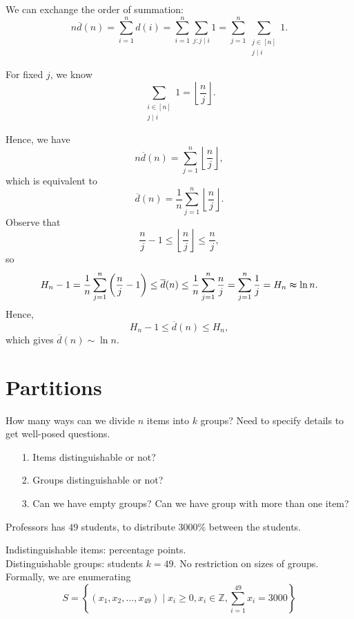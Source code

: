 We can exchange the order of summation: 
\[
    n \overline{d}(n) = \sum_{i=1}^n d(i) = \sum_{i=1}^n \sum_{j: j \mid i} 1 = \sum_{j=1}^n \sum_{\substack{j \in [n] \\ j \mid i}} 1.
\]

For fixed \(j\), we know 
\[
    \sum_{\substack{i \in [n] \\ j \mid i}} 1 = \left\lfloor \frac{n}{j} \right\rfloor.
\] 

Hence, we have 
\[
    n \overline{d}(n) = \sum_{j=1}^n \left\lfloor \frac{n}{j} \right\rfloor,
\] which is equivalent to 
\[
    \overline{d}(n) = \frac{1}{n}\sum_{j=1}^n \left\lfloor \frac{n}{j} \right\rfloor.
\]
Observe that 
\[
    \frac{n}{j} - 1 \le \left\lfloor \frac{n}{j} \right\rfloor \le \frac{n}{j},
\] so 
\[
     H_n - 1=\frac{1}{n} \sum_{j=1}^n \left( \frac{n}{j} - 1 \right) \le \overline{d}(n) \le \frac{1}{n} \sum_{j=1}^n \frac{n}{j} = \sum_{j=1}^n \frac{1}{j} = H_n \thickapprox \ln n.    
\]
Hence, 
\[
    H_n - 1 \le \overline{d}(n) \le H_n, 
\]which gives \(\overline{d}(n) \sim \ln n\). 

\chapter{Partitions}
How many ways can we divide \(n\) items into \(k\) groups? Need to specify details to get well-posed questions. 
\begin{itemize}
    \item [1.] Items distinguishable or not?
    \item [2.] Groups distinguishable or not?
    \item [3.] Can we have empty groups? Can we have group with more than one item?
\end{itemize}  

\begin{eg}
    Professors has \(49\) students, to distribute \(3000\%\) between the students. 
\end{eg}
\begin{explanation}
    Indistinguishable items: percentage points. \\
    Distinguishable groups: students \(k=49\). No restriction on sizes of groups. Formally, we are enumerating 
    \[
        S = \left\{ (x_1, x_2, \dots , x_{49}) \mid x_i \ge 0, x_i \in \mathbb{Z} , \sum_{i=1}^{49} x_i = 3000  \right\} 
    \]
\end{explanation}